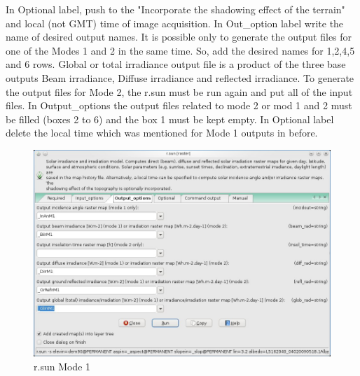 In Optional label, push to the "Incorporate the shadowing effect of the terrain" and local (not GMT) time  of image acquisition.\newline
In Out\_option label write the name of desired output names. It is possible only to generate the output files for one of the Modes 1 and 2 in the same time.  So, add the desired names for 1,2,4,5 and 6 rows. Global or total irradiance output file is a product of the three base outputs Beam irradiance, Diffuse irradiance and reflected irradiance.\newline
To generate the output files for Mode 2, the r.sun must be run again and put all of the input files. In Output\_options the output files related to mode 2 or mod 1 and 2 must be filled (boxes 2 to 6) and the box 1 must be kept empty. In Optional label delete the local time which was mentioned for Mode 1 outputs in before.\newline

\begin{figure}[htbp]
   \centering
   \includegraphics[scale=0.3]{gipe025.png}
   \caption{r.sun Mode 1}
   \label{fig:gipe025}
\end{figure}

